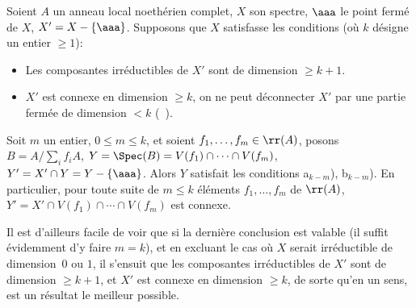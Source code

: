 \begin{theoreme} \label{XIII.2.1}
Soient $A$ un anneau local noeth\'erien complet, $X$ son spectre, $\aaa$ le point ferm\'e de $X$, $X'=X-\{ \aaa\}$. Supposons que $X$ satisfasse les conditions (o\`u $k$ d\'esigne un entier $\ge 1$):
\begin{itemize}
\item[a$_k$)] Les composantes irr\'eductibles de $X'$ sont de dimension $\ge k+1$.

\item[b$_k$)] $X'$ est connexe en dimension $\ge k$, \ie on ne peut d\'econnecter $X'$ par une partie ferm\'ee de dimension $<k$ (\cf {}~).
\end{itemize}

Soit $m$ un entier, $0\le m\le k$, et soient $f_1, \dotsc, f_m\in \rr(A)$, posons $B=A/\sum_i f_iA$, $Y=\Spec(B)=V(f_1)\cap\dotsb\cap V(f_m)$, $Y'=X'\cap Y=Y-\{\aaa\}$. Alors $Y$ satisfait les conditions a$_{k-m}$), b$_{k-m}$). En particulier, pour toute suite de $m\le k$ \'el\'ements $f_1, \dotsc, f_m$ de $\rr(A)$, $Y'=X'\cap V(f_1)\cap\dotsb\cap V(f_m)$ est connexe.
\end{theoreme}

Il est d'ailleurs facile de voir que si la derni\`ere conclusion est valable (il suffit \'evidemment d'y faire $m=k$), et en excluant le cas o\`u $X$ serait irr\'eductible de dimension~$0$ ou $1$, il s'ensuit que les composantes irr\'eductibles de $X'$ sont de dimension $\ge k+1$, et $X'$ est connexe en dimension $\geq k$, de sorte qu'en un sens,  est un r\'esultat \og le meilleur possible\fg.

\bigskip

